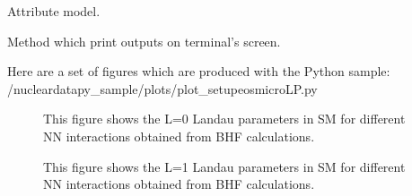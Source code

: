\documentclass[letterpaper,10pt,english]{sphinxmanual}
\begin{document}
\begin{fulllineitems}
\begin{fulllineitems}
\end{fulllineitems}


\begin{fulllineitems}
\label{\detokenize{source/api/setup_eos_micro_lp:nucleardatapy.eos.setup_micro_lp.setupMicroLP.model}}
\pysigstartsignatures
{}
\pysigstopsignatures
\sphinxAtStartPar
Attribute model.

\end{fulllineitems}


\begin{fulllineitems}
\label{\detokenize{source/api/setup_eos_micro_lp:nucleardatapy.eos.setup_micro_lp.setupMicroLP.print_outputs}}
\pysigstartsignatures
{}
\pysigstopsignatures
\sphinxAtStartPar
Method which print outputs on terminal’s screen.

\end{fulllineitems}


\end{fulllineitems}


\sphinxAtStartPar
Here are a set of figures which are produced with the Python sample: /nucleardatapy\_sample/plots/plot\_setupeosmicroLP.py

\begin{figure}[htbp]
\centering
\capstart

\noindent{}
\caption{This figure shows the L=0 Landau parameters in SM for different NN interactions obtained
from BHF calculations.}\label{\detokenize{source/api/setup_eos_micro_lp:id1}}\end{figure}

\begin{figure}[htbp]
\centering
\capstart

\noindent{}
\caption{This figure shows the L=1 Landau parameters in SM for different NN interactions obtained
from BHF calculations.}\label{\detokenize{source/api/setup_eos_micro_lp:id2}}\end{figure}
\end{document}
